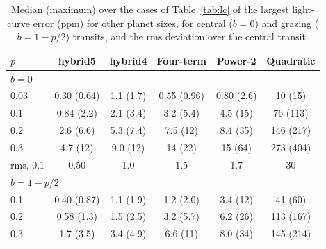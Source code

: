 \documentclass{aa}
\begin{document}
\begin{appendix}
\begin{table}
\caption{Median (maximum) over the cases of Table~\ref{tab:lc} of the largest
light-curve error (ppm) for other planet sizes, for central ($b=0$) and grazing
($b=1-p/2$) transits, and the rms deviation over the central transit.}
\label{tab:geom}
\centering
\small
\setlength{\tabcolsep}{3pt}
\begin{tabular}{lccccc}
\hline\hline
$p$ & hybrid5 & hybrid4 & Four-term & Power-2 & Quadratic\\
\hline
\multicolumn{6}{l}{$b=0$}\\
0.03 & 0.30 (0.64) & 1.1 (1.7) & 0.55 (0.96) & 0.80 (2.6) & 10 (15)\\
0.1 & 0.84 (2.2) & 2.1 (3.4) & 3.2 (5.4) & 4.5 (15) & 76 (113)\\
0.2 & 2.6 (6.6) & 5.3 (7.4) & 7.5 (12) & 8.4 (35) & 146 (217)\\
0.3 & 4.7 (12) & 9.0 (12) & 14 (22) & 15 (64) & 273 (404)\\
rms, 0.1 & 0.50 & 1.0 & 1.5 & 1.7 & 30\\
\multicolumn{6}{l}{$b=1-p/2$}\\
0.1 & 0.40 (0.87) & 1.1 (1.9) & 1.2 (2.0) & 3.4 (12) & 41 (60)\\
0.2 & 0.58 (1.3) & 1.5 (2.5) & 3.2 (5.7) & 6.2 (26) & 113 (167)\\
0.3 & 1.7 (3.5) & 3.4 (4.9) & 6.6 (11) & 8.0 (34) & 145 (214)\\
\hline
\end{tabular}
\end{table}

\end{appendix}
\end{document}
